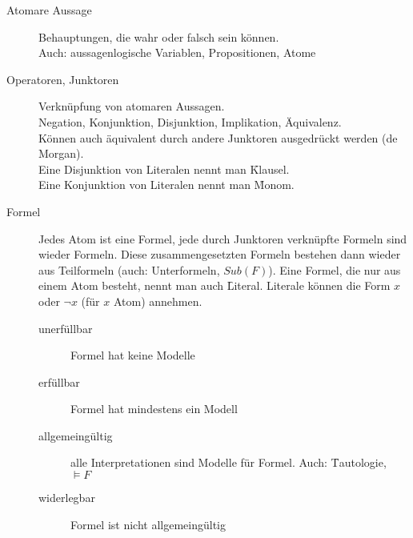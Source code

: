     \begin{description}
        \item[Atomare Aussage] Behauptungen, die wahr oder falsch sein können. \\ Auch: aussagenlogische Variablen, Propositionen, Atome
        \item[Operatoren, Junktoren] Verknüpfung von atomaren Aussagen. \\ Negation, Konjunktion, Disjunktion, Implikation, Äquivalenz. \\
            Können auch äquivalent durch andere Junktoren ausgedrückt werden (de Morgan).  \\
            Eine Disjunktion von Literalen nennt man \f{Klausel}. \\
            Eine Konjunktion von Literalen nennt man \f{Monom}.

        \item[Formel] Jedes Atom ist eine Formel, jede durch Junktoren verknüpfte Formeln sind wieder Formeln.
            Diese zusammengesetzten Formeln bestehen dann wieder aus Teilformeln (auch: Unterformeln, $Sub(F)$).
            Eine Formel, die nur aus einem Atom besteht, nennt man auch \f{Literal}. Literale können die Form $x$ oder $\neg x$ (für $x$ Atom) annehmen.
            \begin{description}
                \item[unerfüllbar] Formel hat keine Modelle
                \item[erfüllbar] Formel hat mindestens ein Modell
                \item[allgemeingültig] alle Interpretationen sind Modelle für Formel. Auch: \f{Tautologie}, $\models F$
                \item[widerlegbar] Formel ist nicht allgemeingültig
            \end{description}


\end{description}
